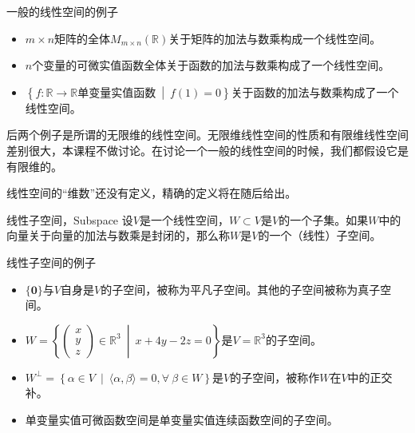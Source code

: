 
\begin{frame}

\begin{block}{一般的线性空间的例子}
\begin{itemize}
\item $m\times n$矩阵的全体$M_{m\times n}(\mathbb{R})$关于矩阵的加法与数乘构成一个线性空间。
\item $n$个变量的可微实值函数全体关于函数的加法与数乘构成了一个线性空间。
\item $\left\{ f: \mathbb{R} \to \mathbb{R} \text{单变量实值函数} \ \middle|\ f(1) = 0 \right\}$关于函数的加法与数乘构成了一个线性空间。
\end{itemize}
\end{block}

\vspace{1em}
\pause

后两个例子是所谓的无限维的线性空间。无限维线性空间的性质和有限维线性空间差别很大，本课程不做讨论。在讨论一个一般的线性空间的时候，我们都假设它是有限维的。

\vspace{1em}
\pause

线性空间的``维数''还没有定义，精确的定义将在随后给出。

\end{frame}


\begin{frame}

\begin{block}{线性子空间，Subspace}
设$V$是一个线性空间，$W \subset V$是$V$的一个子集。如果$W$中的向量关于向量的加法与数乘是封闭的，那么称$W$是$V$的一个（线性）子空间。
\end{block}

\begin{block}{线性子空间的例子}
\begin{itemize}
\item $\{\mathbf{0}\}$与$V$自身是$V$的子空间，被称为平凡子空间。其他的子空间被称为真子空间。
\item \(\displaystyle W = \left\{ \begin{pmatrix}
x \\ y \\ z\end{pmatrix} \in \mathbb{R}^3 \ \middle| \ x + 4y -2z = 0\right\} \)是$V = \mathbb{R}^3$的子空间。
\item \(\displaystyle W^{\perp} = \left\{ \alpha \in V \ \middle| \ \langle \alpha, \beta \rangle = 0, \forall~\beta \in W \right\} \)是$V$的子空间，被称作$W$在$V$中的正交补。
\item 单变量实值可微函数空间是单变量实值连续函数空间的子空间。
\end{itemize}
\end{block}

\end{frame}

